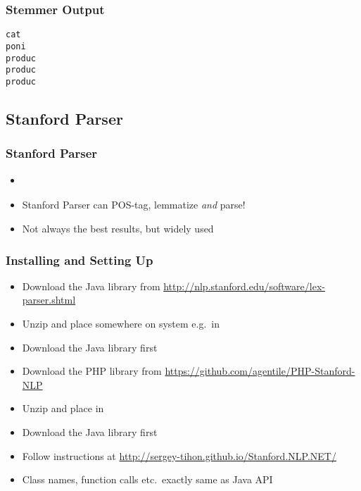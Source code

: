 \begin{frame}[fragile]
\frametitle{Stemmer Output}

\begin{lstlisting}[columns=fullflexible]
cat
poni
produc
produc
produc
\end{lstlisting}

\end{frame}

\subsection{Stanford Parser}


\begin{frame}
\frametitle{Stanford Parser}

\begin{itemize}
\item \parencite{stanford:parser:2003}
\item Stanford Parser can POS-tag, lemmatize \emph{and} parse!
\item Not always the best results, but widely used \Winkey
\end{itemize}    

\end{frame}



\begin{frame}
\frametitle{Installing and Setting Up}

\begin{description}[Java]

\item[Java]
	\begin{itemize}
	\item Download the Java library from \url{http://nlp.stanford.edu/software/lex-parser.shtml}
	\item Unzip and place somewhere on system e.g.~in \\[1em]
	\end{itemize}

\item[PHP]
	\begin{itemize}
	\item Download the Java library first
	\item Download the PHP library from \url{https://github.com/agentile/PHP-Stanford-NLP}
	\item Unzip and place in \\[1em]
	\end{itemize}

\item[.NET]
	\begin{itemize}
	\item Download the Java library first
	\item Follow instructions at \url{http://sergey-tihon.github.io/Stanford.NLP.NET/}
    \item Class names, function calls etc.~exactly same as Java API
	\end{itemize}
\end{description}

\end{frame}


